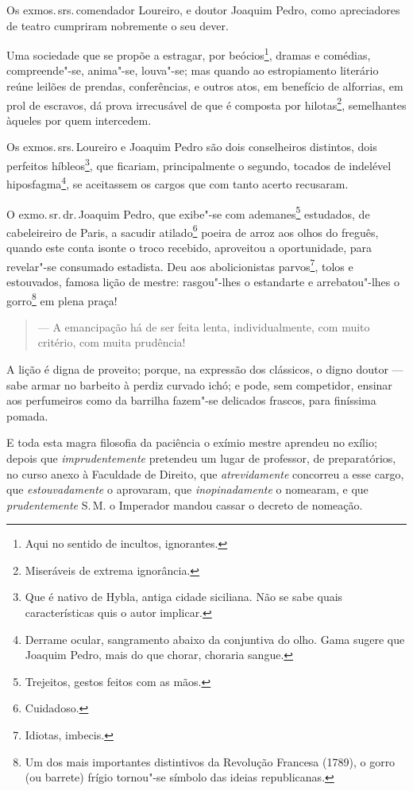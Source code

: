Os exmos.\,srs.\,comendador Loureiro, e doutor Joaquim Pedro, como
apreciadores de teatro cumpriram nobremente o seu dever.

Uma sociedade que se propõe a estragar, por beócios\footnote{Aqui no
  sentido de incultos, ignorantes.}, dramas e comédias, compreende"-se,
anima"-se, louva"-se; mas quando ao estropiamento literário reúne leilões
de prendas, conferências, e outros atos, em benefício de alforrias, em
prol de escravos, dá prova irrecusável de que é composta por
hilotas\footnote{Miseráveis de extrema ignorância.}, semelhantes
àqueles por quem intercedem.

Os exmos.\,srs.\,Loureiro e Joaquim Pedro são dois conselheiros distintos,
dois perfeitos híbleos\footnote{Que é nativo de Hybla, antiga cidade
  siciliana. Não se sabe quais características quis o autor implicar.},
que ficariam, principalmente o segundo, tocados de indelével
hiposfagma\footnote{Derrame ocular, sangramento abaixo da conjuntiva
  do olho. Gama sugere que Joaquim Pedro, mais do que chorar, choraria
  sangue.}, se aceitassem os cargos que com tanto acerto recusaram.

O exmo.\,sr.\,dr.\,Joaquim Pedro, que exibe"-se com ademanes\footnote{
  Trejeitos, gestos feitos com as mãos.} estudados, de cabeleireiro de
Paris, a sacudir atilado\footnote{Cuidadoso.} poeira de arroz aos
olhos do freguês, quando este conta isonte o troco recebido, aproveitou
a oportunidade, para revelar"-se consumado estadista. Deu aos
abolicionistas parvos\footnote{Idiotas, imbecis.}, tolos e estouvados,
famosa lição de mestre: rasgou"-lhes o estandarte e arrebatou"-lhes o
gorro\footnote{Um dos mais importantes distintivos da Revolução
  Francesa (1789), o gorro (ou barrete) frígio tornou"-se símbolo das
  ideias republicanas.} em plena praça!

\begin{quote}
--- A emancipação há de ser feita lenta, individualmente, com muito
critério, com muita prudência!
\end{quote}

A lição é digna de proveito; porque, na expressão dos clássicos, o digno
doutor --- sabe armar no barbeito à perdiz curvado ichó; e pode, sem
competidor, ensinar aos perfumeiros como da barrilha fazem"-se delicados
frascos, para finíssima pomada.

E toda esta magra filosofia da paciência o exímio mestre aprendeu no
exílio; depois que \emph{imprudentemente} pretendeu um lugar de
professor, de preparatórios, no curso anexo à Faculdade de Direito, que
\emph{atrevidamente} concorreu a esse cargo, que \emph{estouvadamente} o
aprovaram, que \emph{inopinadamente} o nomearam, e que
\emph{prudentemente} S.\,M. o Imperador mandou cassar o decreto de
nomeação.

